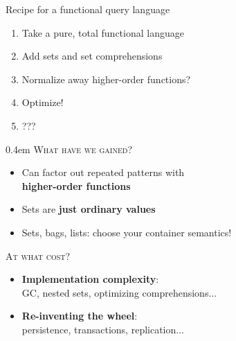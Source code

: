 \documentclass[xcolor=table,usenames,dvipsnames,svgnames]{beamer}
\begin{document}

\begin{frame}{Recipe for a functional query language}\Large
  \begin{enumerate}\itemsep 1.5em
  \item Take a pure, total functional language
  \item Add sets and set comprehensions
  \item Normalize away higher-order functions?
  \item Optimize!
  \item ???
  \end{enumerate}
\end{frame}


\begin{frame}{}\large\parskip 0.4em
  \textsc{What have we gained?}
  \begin{itemize}\itemsep 0.5em
  \item Can factor out repeated patterns with\\ \textbf{higher-order functions}
  \item Sets are \textbf{just ordinary values}
  \item Sets, bags, lists: choose your container semantics!
  \end{itemize}

  \vspace{1em}\pause

  \textsc{At what cost?}
  \begin{itemize}
  \item \textbf{Implementation complexity}:\\
    {\small GC, nested sets, optimizing comprehensions...}
  \item \textbf{Re-inventing the wheel}:\\
    {\small persistence, transactions, replication...}
  \end{itemize}

\end{frame}
\end{document}
